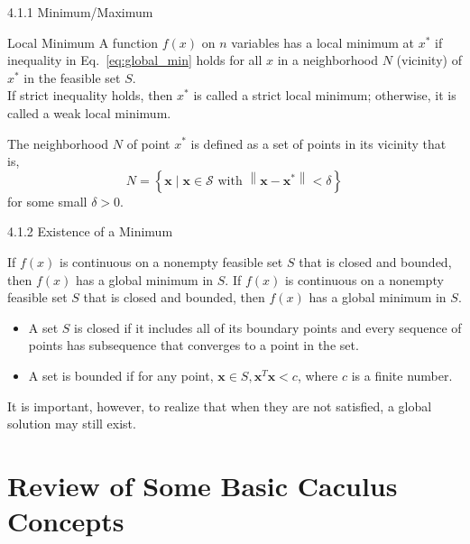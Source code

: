 \documentclass[aspectratio=169,xcolor=dvipsnames]{beamer}
\begin{document}

\begin{frame}{4.1.1 Minimum/Maximum}

\begin{block}{Local Minimum}
    A function $f(x)$ on $n$ variables has a local minimum at $x^*$ if inequality in Eq.~\ref{eq:global_min} holds for all $x$ in a neighborhood $N$ (vicinity) of $x^*$ in the feasible set $S$. \\
    If strict inequality holds, then $x^*$ is called a strict local minimum; otherwise, it is called a weak local minimum.
\end{block}
The neighborhood $N$ of point $x^*$ is defined as a set of points in its vicinity that is,
\begin{equation*}
    N = \left\{ \mathbf{x} \mid \mathbf{x} \in \mathcal{S} \text{ with } \left\| \mathbf{x} - \mathbf{x}^* \right\| < \delta \right\}
\end{equation*}
for some small $\delta > 0$.

\end{frame}

\begin{frame}{4.1.2 Existence of a Minimum}
    
\begin{theorem}
    If $f(x)$ is continuous on a nonempty feasible set $S$ that is closed and bounded, then $f(x)$ has a global minimum in $S$.
If $f(x)$ is continuous on a nonempty feasible set $S$ that is closed and bounded, then $f(x)$ has a global minimum in $S$.
\end{theorem}
\begin{itemize}
    \item A set $S$ is closed if it includes all of its boundary points and every sequence of points has subsequence that converges to a point in the set.
    \item A set is bounded if for any point, $\mathbf{x} \in S, \mathbf{x}^T\mathbf{x} < c$, where $c$ is a finite number.
\end{itemize}
It is important, however, to realize that when they are not satisfied, a global solution may still exist.

\end{frame}

\section{Review of Some Basic Caculus Concepts}
\end{document}
